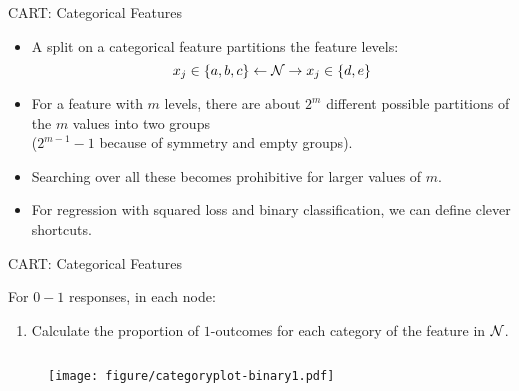 \documentclass[11pt,compress,t,notes=noshow, xcolor=table]{beamer}
\begin{document}
  \begin{vbframe}{CART: Categorical Features}
  \begin{itemize}
  \item A split on a categorical feature partitions the feature levels:
    $$x_j \in \{a,b,c\} \leftarrow \mathcal{N} \rightarrow x_j \in \{d,e\} $$
  \item For a feature with $m$ levels,
  there are about $2^m$ different possible partitions of the $m$ values into two groups\\ ($2^{m-1} - 1$ because of symmetry and empty groups).
  \item Searching over all these becomes prohibitive for larger values of $m$.
  \item For regression with squared loss and binary classification, we can define clever shortcuts.
  \end{itemize}

  \end{vbframe}
  
  \begin{vbframe}{CART: Categorical Features}

For $0-1$ responses, in each node:
  \begin{enumerate}
  \item Calculate the proportion of $1$-outcomes for each category of the feature in $\mathcal{N}$.

  \end{enumerate}
  \begin{columns}
  \begin{column}{0.33\textwidth}
  \begin{figure}
  \texttt{[image: figure/categoryplot-binary1.pdf]} 
  \end{figure}
  \end{column}
  \begin{column}{0.33\textwidth}
  \lz
  \end{column}
  \begin{column}{0.33\textwidth}
  \lz
  \end{column}
  \end{columns}

\end{vbframe}
\end{document}
